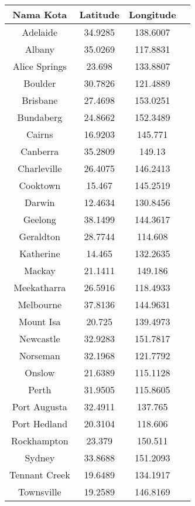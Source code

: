 \documentclass[12pt,a4paper]{article}
\begin{document}
\begin{table}[h]
    \centering
    \begin{tabular}{|c|c|c|c|}
        \hline
        \textbf{Nama Kota} & \textbf{Latitude} & \textbf{Longitude} \\
        \hline
        Adelaide & 34.9285 & 138.6007 \\
        Albany & 35.0269 & 117.8831 \\
        Alice Springs & 23.698 & 133.8807 \\
        Boulder & 30.7826 & 121.4889  \\
        Brisbane & 27.4698 & 153.0251  \\
        Bundaberg & 24.8662 & 152.3489  \\
        Cairns & 16.9203 & 145.771  \\
        Canberra & 35.2809 & 149.13  \\
        Charleville & 26.4075 & 146.2413  \\
        Cooktown & 15.467 & 145.2519  \\
        Darwin & 12.4634 & 130.8456  \\
        Geelong & 38.1499 & 144.3617  \\
        Geraldton & 28.7744 & 114.608  \\
        Katherine & 14.465 & 132.2635  \\
        Mackay & 21.1411 & 149.186  \\
        Meekatharra & 26.5916 & 118.4933  \\
        Melbourne & 37.8136 & 144.9631  \\
        Mount Isa & 20.725 & 139.4973  \\
        Newcastle & 32.9283 & 151.7817  \\
        Norseman & 32.1968 & 121.7792  \\
        Onslow & 21.6389 & 115.1128  \\
        Perth & 31.9505 & 115.8605  \\
        Port Augusta & 32.4911 & 137.765  \\
        Port Hedland & 20.3104 & 118.606  \\
        Rockhampton & 23.379 & 150.511  \\
        Sydney & 33.8688 & 151.2093  \\
        Tennant Creek & 19.6489 & 134.1917  \\
        Townsville & 19.2589 & 146.8169  \\
        \hline
    \end{tabular}
\end{table}
\end{document}
